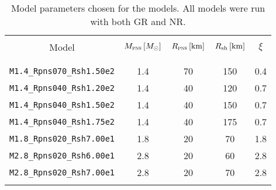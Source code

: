 \begin{table}[b]
  \scriptsize
  \renewcommand{\tabcolsep}{0.09cm}
  \centering
  \begin{tabularx}{0.5\textwidth}{ccccc} \\
    \toprule \\
    Model &
    $M_{\textsc{pns}}\left[M_{\odot}\right]$ &
    $R_{\textsc{pns}}\left[\mathrm{km}\right]$ &
    $R_{\mathrm{sh}}\left[\mathrm{km}\right]$ &
    $\xi$ \\ \\
    \midrule \\
    \texttt{M1.4\_Rpns070\_Rsh1.50e2} & 1.4 & 70 & 150 & 0.4 \\
    \texttt{M1.4\_Rpns040\_Rsh1.20e2} & 1.4 & 40 & 120 & 0.7 \\
    \texttt{M1.4\_Rpns040\_Rsh1.50e2} & 1.4 & 40 & 150 & 0.7 \\
    \texttt{M1.4\_Rpns040\_Rsh1.75e2} & 1.4 & 40 & 175 & 0.7 \\
    \texttt{M1.8\_Rpns020\_Rsh7.00e1} & 1.8 & 20 &  70 & 1.8 \\
    \texttt{M2.8\_Rpns020\_Rsh6.00e1} & 2.8 & 20 &  60 & 2.8 \\
    \texttt{M2.8\_Rpns020\_Rsh7.00e1} & 2.8 & 20 &  70 & 2.8 \\
    \bottomrule \\
  \end{tabularx}
  \caption{Model parameters chosen for the \nModels{} models.
  All models were run with both GR and NR.
  }
  \label{tab.modelParameters}
\end{table}

